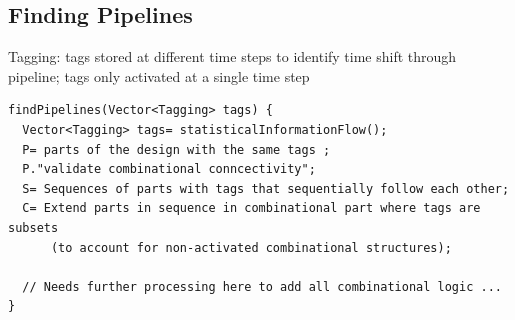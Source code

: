 \subsection{Finding Pipelines}
Tagging: tags stored at different time steps to identify time shift through pipeline; tags only activated at a single time step



\begin{verbatim}
findPipelines(Vector<Tagging> tags) {
  Vector<Tagging> tags= statisticalInformationFlow();
  P= parts of the design with the same tags ;
  P."validate combinational conncectivity";
  S= Sequences of parts with tags that sequentially follow each other;
  C= Extend parts in sequence in combinational part where tags are subsets 
      (to account for non-activated combinational structures);

  // Needs further processing here to add all combinational logic ...
}
\end{verbatim}

